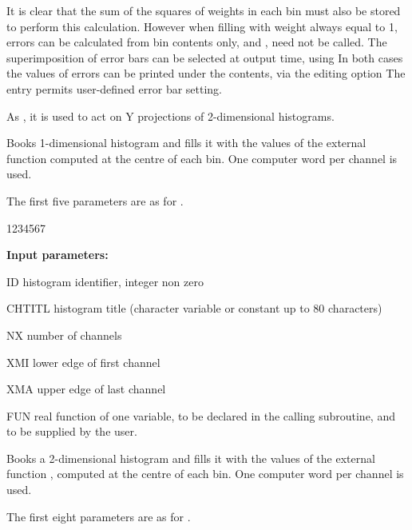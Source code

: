 It is clear that the sum of the squares of weights in each
bin must also be stored to perform this calculation. However
when filling with weight always equal to 1, errors can be
calculated from bin contents only, and , 
need not be called. 
The superimposition of error bars can be selected at output time, using
In both cases the values of errors can be printed under the contents,
via the editing option 
The entry  permits user-defined error bar setting.
\medskip

\Action As , it is used to act on Y
projections of 2-dimensional histograms.
 
 
 
\Action Books 1-dimensional histogram and fills it with the values of the
external function  computed at the centre of each bin.
One computer word per channel is used.
 
The first five parameters are as for .
 
\begin{DLtt}{1234567}
\item[{\rm\bf Input parameters:}]
\item[ID] histogram identifier, integer non zero
\item[CHTITL] histogram title (character variable or constant up to 80
              characters)
\item[NX] number of channels
\item[XMI] lower edge of first channel
\item[XMA] upper edge of last channel
\item[FUN] real function of one variable, to be declared
            in the calling subroutine, and to be
           supplied by the user.
\end{DLtt}
 

\Action Books a 2-dimensional
histogram and fills it with the values of the external
function , computed at the centre of each bin.
One computer word per channel is used.
 
The first eight parameters are as for .

